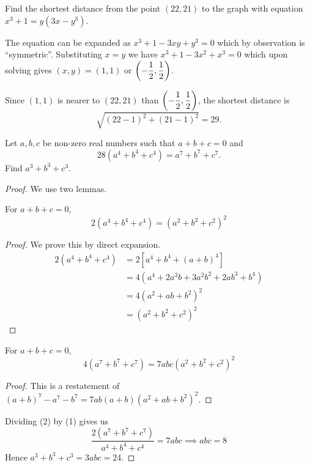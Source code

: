 \begin{prbm}
Find the shortest distance from the point $(22,21)$ to the graph with equation $x^3+1=y(3x-y^3)$.
\end{prbm}

\begin{solution}
The equation can be expanded as $x^3+1-3xy+y^3=0$ which by observation is ``symmetric''. Substituting $x=y$ we have $x^3+1-3x^2+x^3=0$ which upon solving gives $(x,y)=(1,1)$ or $\left(-\dfrac{1}{2},\dfrac{1}{2}\right)$.

Since $(1,1)$ is nearer to $(22,21)$ than $\left(-\dfrac{1}{2},\dfrac{1}{2}\right)$, the shortest distance is
\[ \sqrt{(22-1)^2+(21-1)^2}=\boxed{29}. \]
\end{solution}
\pagebreak

\begin{prbm}
Let $a,b,c$ be non-zero real numbers such that $a+b+c=0$ and
\[ 28(a^4+b^4+c^4)=a^7+b^7+c^7. \]
Find $a^3+b^3+c^3$.
\end{prbm}
\begin{proof}
We use two lemmas.

\begin{lemma}
For $a+b+c=0$, 
\begin{equation*}\tag{1}
2(a^4+b^4+c^4)=(a^2+b^2+c^2)^2
\end{equation*}
\end{lemma}
\begin{proof}
We prove this by direct expansion.
\begin{align*}
2(a^4+b^4+c^4) &= 2[a^4+b^4+(a+b)^4] \\
&= 4(a^4+2a^3b+3a^2b^2+2ab^3+b^4) \\
&= 4(a^2+ab+b^2)^2 \\
&= (a^2+b^2+c^2)^2
\end{align*}
\end{proof}

\begin{lemma}
For $a+b+c=0$,
\begin{equation*}\tag{2}
4(a^7+b^7+c^7)=7abc(a^2+b^2+c^2)^2
\end{equation*}
\end{lemma}
\begin{proof}
This is a restatement of $(a+b)^7-a^7-b^7=7ab(a+b)(a^2+ab+b^2)^2$.
\end{proof}

Dividing (2) by (1) gives us
\[ \frac{2(a^7+b^7+c^7)}{a^4+b^4+c^4}=7abc \implies abc=8 \]
Hence $a^3+b^3+c^3=3abc=\boxed{24}$.
\end{proof}
\pagebreak

